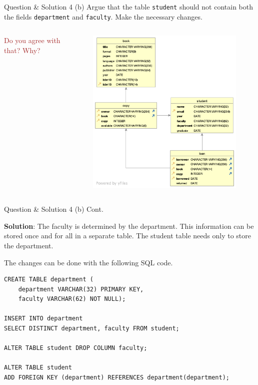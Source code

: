 \begin{frame}[fragile]{Question \& Solution 4 (b)}
Argue that the table \texttt{student} should not contain both the fields \texttt{department} and \texttt{faculty}. Make the necessary changes. 

\begin{columns}
	\textcolor{brown}{Do you agree with that? Why?}
	\begin{figure}
		\includegraphics[width=1\textwidth]{t1/images/t1-0.png}
	\end{figure}
\end{columns}
\end{frame}

\begin{frame}[fragile]{Question \& Solution 4 (b) Cont.}

\textbf{Solution}:
The faculty is determined by the department. This information can be stored once and for all in a separate table. The student table needs only to store the department. \vspace{10pt}

The changes can be done with the following SQL code.

\begin{lstlisting}
CREATE TABLE department (
	department VARCHAR(32) PRIMARY KEY,
	faculty VARCHAR(62) NOT NULL);

INSERT INTO department 
SELECT DISTINCT department, faculty FROM student;

ALTER TABLE student DROP COLUMN faculty;

ALTER TABLE student
ADD FOREIGN KEY (department) REFERENCES department(department);
\end{lstlisting}
\end{frame}


